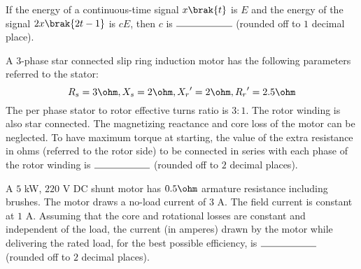 \iffalse
\title{GATE}
\author{EE}
\chapter{2024}
\section{EE}
\fi


\item If the energy of a continuous-time signal $x\brak{t}$ is $E$ and the energy of the signal $2x\brak{2t-1}$ is $cE$, then $c$ is $\rule{2cm}{0.4pt}$ (rounded off to $1$ decimal place).

	\item A $3$-phase star connected slip ring induction motor has the following parameters referred to the stator:
		$$R_s=3\ohm, X_s=2\ohm, {X_r}'=2\ohm, {R_r}'=2.5\ohm$$
The per phase stator to rotor effective turns ratio is $3:1$. The rotor winding is also star connected. The magnetizing reactance and core loss of the motor can be neglected. To have maximum torque at starting, the value of the extra resistance in ohms (referred to the rotor side) to be connected in series with each phase of the rotor winding is $\rule{2cm}{0.4pt}$ (rounded off to $2$ decimal places).

        \item  A $5$ kW, $220$ V DC shunt motor has $0.5\ohm$ armature resistance including brushes. The motor draws a no-load current of $3$ A. The field current is constant at $1$ A. Assuming that the core and rotational losses are constant and independent of the load, the current (in amperes) drawn by the motor while delivering the rated load, for the best possible efficiency, is $\rule{2cm}{0.4pt}$ (rounded off to $2$ decimal places).

